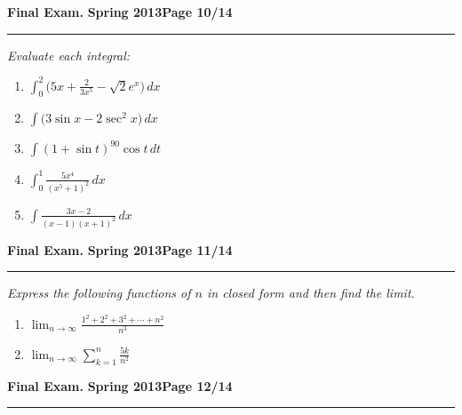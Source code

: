 \documentclass[12pt]{article}
\begin{document}
{%
\hfill{\large\bf Final Exam.}\hfill{\large\bf
  Spring 2013}\hfill{\large\bf Page 10/14}\hrule

\bigskip
{\problem[25 pts] \em  Evaluate each integral:} 
\begin{enumerate}
\item $\displaystyle{\int_0^2 \big( 5x + \frac{2}{3x^5} - \sqrt{2} e^x \big)\, dx}$
\vspace{2.5cm}
\item $\displaystyle{\int \big( 3\sin x - 2\sec^2 x \big)\, dx}$
\vspace{2.5cm}
\item $\displaystyle{\int ( 1 + \sin t)^{90} \cos t\, dt}$
\vspace{2.5cm}
\item $\displaystyle{\int_0^1 \frac{5x^4}{(x^5+1)^2}\, dx}$
\vspace{2.5cm}
\item $\displaystyle{\int \frac{3x-2}{(x-1)(x+1)^2}\, dx}$
\end{enumerate}
\newpage

\hfill{\large\bf Final Exam.}\hfill{\large\bf
  Spring 2013}\hfill{\large\bf Page 11/14}\hrule

\bigskip
{\problem[30 pts] \em Express the following functions of $n$ in closed
  form and then find the limit.}
\begin{enumerate}
\item  $\displaystyle{\lim_{n \to \infty} \frac{1^2+2^2+3^2+ \dotsb +
      n^2}{n^3}}$
\vspace{9cm}
\item  $\displaystyle{\lim_{n \to \infty} \sum_{k=1}^n \frac{5k}{n^2}}$
\vspace{9cm}
\end{enumerate}
\newpage

\hfill{\large\bf Final Exam.}\hfill{\large\bf
  Spring 2013}\hfill{\large\bf Page 12/14}\hrule

}
\end{document}
